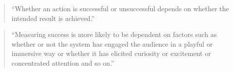 \begin{quote}
  ``Whether an action is successful or unsuccessful depends on whether the intended result is achieved.'' \parencite[p.23]{Candy2012}
\end{quote}

\begin{quote}
  ``Measuring success is more likely to be dependent on factors such as whether or not the system has engaged the audience in a playful or immersive way or whether it has elicited curiosity or excitement or concentrated attention and so on.'' \parencite[p.23]{Candy2012}
\end{quote}



%
%
%
%
%
%
%
%
